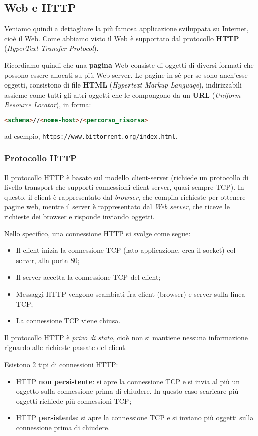 \documentclass[a4paper,11pt]{article}
\begin{document}
\subsection{Web e HTTP}
Veniamo quindi a dettagliare la più famosa applicazione sviluppata su Internet, cioè il Web.
Come abbiamo visto il Web è supportato dal protocollo \textbf{HTTP} (\textit{HyperText Transfer Protocol}).

Ricordiamo quindi che una \textbf{pagina} Web consiste di oggetti di diversi formati che possono essere allocati su più Web server.
Le pagine in sé per se sono anch'esse oggetti, consistono di file \textbf{HTML} (\textit{Hypertext Markup Language}), indirizzabili assieme come tutti gli altri oggetti che le compongono da un \textbf{URL} (\textit{Uniform Resource Locator}), in forma:
\begin{lstlisting}[language=html, style=codestyle]	
<schema>//<nome-host>/<percorso_risorsa>
\end{lstlisting}
ad esempio, \lstinline|https://www.bittorrent.org/index.html|.

\subsubsection{Protocollo HTTP}
Il protocollo HTTP è basato sul modello client-server (richiede un protocollo di livello transport che supporti connessioni client-server, quasi sempre TCP).
In questo, il client è rappresentato dal \textit{browser}, che compila richieste per ottenere pagine web, mentre il server è rappresentato dal \textit{Web server}, che riceve le richieste dei browser e risponde inviando oggetti.

Nello specifico, una connessione HTTP si svolge come segue:
\begin{itemize}
	\item Il client inizia la connessione TCP (lato applicazione, crea il socket) col server, alla porta 80;
	\item Il server accetta la connessione TCP del client;
	\item Messaggi HTTP vengono scambiati fra client (browser) e server sulla linea TCP;
	\item La connessione TCP viene chiusa.
\end{itemize}

Il protocollo HTTP è \textit{privo di stato}, cioè non si mantiene nessuna informazione riguardo alle richieste passate del client.

Esistono 2 tipi di connessioni HTTP:
\begin{itemize}
	\item HTTP \textbf{non persistente}: si apre la connessione TCP e si invia al più un oggetto sulla connessione prima di chiudere. In questo caso scaricare più oggetti richiede più connessioni TCP; 
	\item HTTP \textbf{persistente}: si apre la connessione TCP e si inviano più oggetti sulla connessione prima di chiudere.
\end{itemize}
\end{document}
